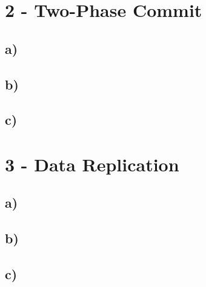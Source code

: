 \documentclass{scrartcl}
\begin{document}
\section*{2 - Two-Phase Commit}
\subsection*{a)}
\subsection*{b)}
\subsection*{c)}

\section*{3 - Data Replication}
\subsection*{a)}
\subsection*{b)}
\subsection*{c)}
\end{document}
